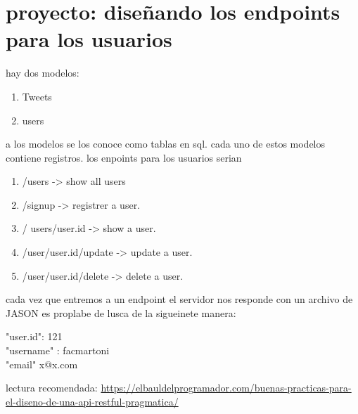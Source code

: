 \documentclass{article}
\begin{document}
    \section{proyecto: diseñando los endpoints para los usuarios}
    hay dos modelos: \begin{enumerate}
        \item Tweets
        \item users
    \end{enumerate}
    a los modelos se los conoce como tablas en sql. cada uno de estos modelos contiene registros.
    los enpoints para los usuarios serian \begin{enumerate}
        \item /users -> show all users
        \item /signup -> registrer a user.
        \item / users/{user.id} -> show a user.
        \item /user/{user.id}/update -> update a user.
        \item /user/{user.id}/delete -> delete a user.
    \end{enumerate}
    cada vez que entremos a un endpoint el servidor nos responde con un archivo de JASON
    es proplabe de lusca de la sigueinete manera:\\
    {
        \begin{center}
        "user.id": 121\\
        "username" : facmartoni\\
        "email" x@x.com\\
        \end{center}
    }
    lectura recomendada: \url{https://elbauldelprogramador.com/buenas-practicas-para-el-diseno-de-una-api-restful-pragmatica/}
\end{document}
